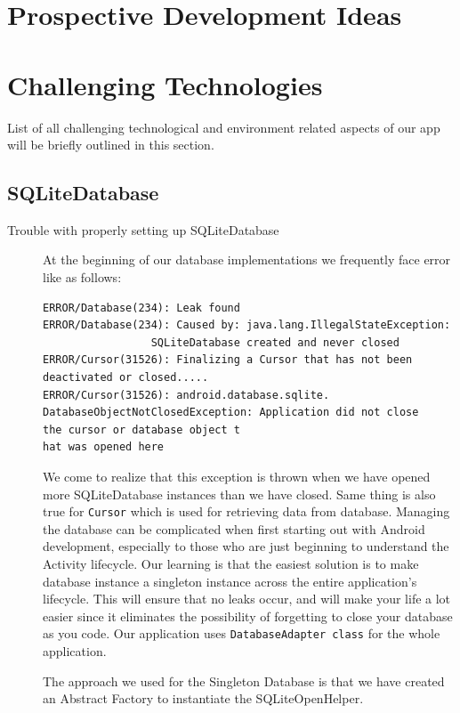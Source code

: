 \documentclass[10pt,a4paper]{report}
\begin{document}
 \section{Prospective Development Ideas}
	
 \section{Challenging Technologies}
 List of all challenging technological and environment related aspects of our app will be briefly outlined in this section.
  \subsection{SQLiteDatabase}
  
  \begin{description}
  
  
  
\item[Trouble with properly setting up SQLiteDatabase] At the beginning of our database implementations we frequently face error like as follows:

\begin{verbatim}
ERROR/Database(234): Leak found
ERROR/Database(234): Caused by: java.lang.IllegalStateException:
                 SQLiteDatabase created and never closed
ERROR/Cursor(31526): Finalizing a Cursor that has not been 
deactivated or closed.....
ERROR/Cursor(31526): android.database.sqlite.
DatabaseObjectNotClosedException: Application did not close 
the cursor or database object t
hat was opened here                  
\end{verbatim}

We come to realize that this exception is thrown when we have opened more SQLiteDatabase instances than we have closed. Same thing is also true for \texttt{Cursor} which is used for retrieving data from database. Managing the database can be complicated when first starting out with Android development, especially to those who are just beginning to understand the Activity lifecycle. Our learning is that the easiest solution is to make database instance a singleton instance across the entire application's lifecycle. This will ensure that no leaks occur, and will make your life a lot easier since it eliminates the possibility of forgetting to close your database as you code. Our application uses \texttt{DatabaseAdapter class} for the whole application.

The approach we used for the Singleton Database is that we have created an Abstract Factory to instantiate the SQLiteOpenHelper.


\end{description}
\end{document}
